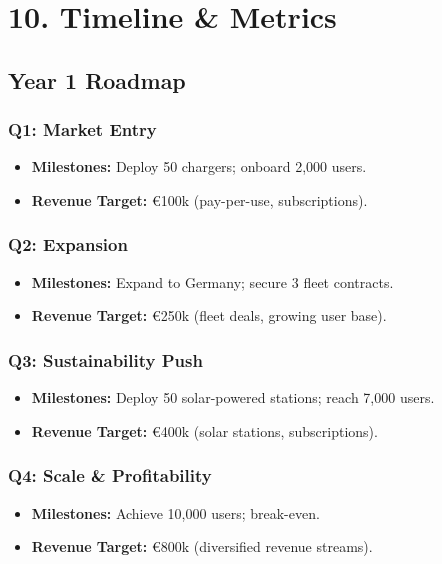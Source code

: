 \section{10. Timeline \& Metrics}

\subsection*{Year 1 Roadmap}

\subsubsection*{Q1: Market Entry}
\begin{itemize}
    \item \textbf{Milestones:} Deploy 50 chargers; onboard 2,000 users.
    \item \textbf{Revenue Target:} €100k (pay-per-use, subscriptions).
\end{itemize}

\subsubsection*{Q2: Expansion}
\begin{itemize}
    \item \textbf{Milestones:} Expand to Germany; secure 3 fleet contracts.
    \item \textbf{Revenue Target:} €250k (fleet deals, growing user base).
\end{itemize}

\subsubsection*{Q3: Sustainability Push}
\begin{itemize}
    \item \textbf{Milestones:} Deploy 50 solar-powered stations; reach 7,000 users.
    \item \textbf{Revenue Target:} €400k (solar stations, subscriptions).
\end{itemize}

\subsubsection*{Q4: Scale \& Profitability}
\begin{itemize}
    \item \textbf{Milestones:} Achieve 10,000 users; break-even.
    \item \textbf{Revenue Target:} €800k (diversified revenue streams).
\end{itemize}

